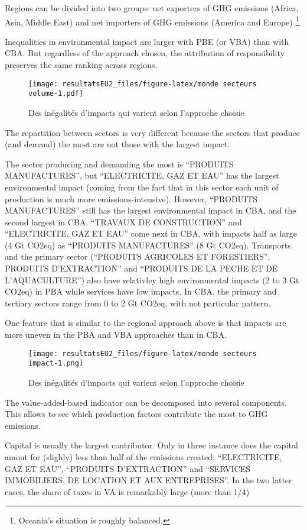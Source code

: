 \documentclass[
]{article}
\begin{document}
{{Regions can be divided into two groups: net exporters of GHG emissions
(Africa, Asia, Middle East) and net importers of GHG emissions (America
and Europe) \footnote{Oceania's situation is roughly balanced.}.

Inequalities in environmental impact are larger with PBE (or VBA) than
with CBA. But regardless of the approach chosen, the attribution of
responsibility preserves the same ranking across regions.

\begin{figure}
\centering
\texttt{[image: resultatsEU2\_files/figure-latex/monde secteurs volume-1.pdf]}
\caption{Des inégalités d'impacts qui varient selon l'approche choisie}
\end{figure}

The repartition between sectors is very different because the sectors
that produce (and demand) the most are not those with the largest
impact.

The sector producing and demanding the most is ``PRODUITS
MANUFACTURES'', but ``ELECTRICITE, GAZ ET EAU'' has the largest
environmental impact (coming from the fact that in this sector each unit
of production is much more emissions-intensive). However, ``PRODUITS
MANUFACTURES'' still has the largest environmental impact in CBA, and
the second largest in CBA. ``TRAVAUX DE CONSTRUCTION'' and
``ELECTRICITE, GAZ ET EAU'' come next in CBA, with impacts half as large
(4 Gt CO2eq) as ``PRODUITS MANUFACTURES'' (8 Gt CO2eq). Transports and
the primary sector (``PRODUITS AGRICOLES ET FORESTIERS'', PRODUITS
D'EXTRACTION'' and ``PRODUITS DE LA PECHE ET DE L'AQUACULTURE'') also
have relativley high environmental impacts (2 to 3 Gt CO2eq) in PBA
while services have low impacts. In CBA, the primary and tertiary
sectors range from 0 to 2 Gt CO2eq, with not particular pattern.

One feature that is similar to the regional approach above is that
impacts are more uneven in the PBA and VBA approaches than in CBA.

\begin{figure}
\centering
\texttt{[image: resultatsEU2\_files/figure-latex/monde secteurs impact-1.png]}
\caption{Des inégalités d'impacts qui varient selon l'approche choisie}
\end{figure}

The value-added-based indicator can be decomposed into several
components. This allows to see which production factors contribute the
most to GHG emissions.

Capital is usually the largest contributor. Only in three instance does
the capital amout for (slighly) less than half of the emissions created:
``ELECTRICITE, GAZ ET EAU'', ``PRODUITS D'EXTRACTION'' and ``SERVICES
IMMOBILIERS, DE LOCATION ET AUX ENTREPRISES''. In the two latter cases,
the share of taxes in VA is remarkably large (more than 1/4)

}}
\end{document}
